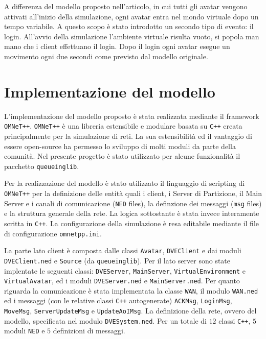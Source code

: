 \documentclass[a4paper, 11pt, oneside]{book}
\theoremstyle{definition}
\theoremstyle{remark}
\begin{document}
A differenza del modello proposto nell'articolo, in cui tutti gli avatar vengono
attivati all'inizio della simulazione, ogni avatar entra nel mondo virtuale
dopo un tempo variabile. A questo scopo è stato introdotto un secondo tipo
di evento: il login. All'avvio della simulazione l'ambiente virtuale
risulta vuoto, si popola man mano che i client effettuano il login.
Dopo il login ogni avatar esegue un movimento ogni due secondi come previsto
dal modello originale.

\chapter{Implementazione del modello}\label{impl}
L'implementazione del modello proposto è stata realizzata mediante il framework
\texttt{OMNeT++}. \texttt{OMNeT++} è una libreria estensibile e modulare
basata su \texttt{C++} creata principalmente per la simulazione di reti.
La sua estensibilità ed il vantaggio di essere open-source ha permesso lo
sviluppo di molti moduli da parte della comunità. Nel presente progetto
è stato utilizzato per alcune funzionalità il pacchetto \texttt{queueinglib}.

Per la realizzazione del modello è stato utilizzato il linguaggio di
scripting di \texttt{OMNeT++} per la definizione delle entità quali i client,
i Server di Partizione, il Main Server e i canali di comunicazione
(\texttt{NED} files), la definzione dei messaggi (\texttt{msg} files) e
la struttura generale della rete. La logica sottostante è stata invece
interamente scritta in \texttt{C++}. La configurazione della simulazione
è resa editabile mediante il file di configurazione \texttt{omnetpp.ini}.

La parte lato client è composta dalle classi \texttt{Avatar}, \texttt{DVEClient}
e dai moduli \texttt{DVEClient.ned} e \texttt{Source} (da \texttt{queueinglib}).
Per il lato server sono state implentate le seguenti classi: \texttt{DVEServer},
\texttt{MainServer}, \texttt{VirtualEnvironment} e \texttt{VirtualAvatar}, ed
i moduli \texttt{DVEServer.ned} e \texttt{MainServer.ned}.
Per quanto riguarda la comunicazione è stata implementata la classe
\texttt{WAN}, il modulo \texttt{WAN.ned} ed i messaggi (con le relative classi
\texttt{C++} autogenerate) \texttt{ACKMsg}, \texttt{LoginMsg}, \texttt{MoveMsg},
\texttt{ServerUpdateMsg} e \texttt{UpdateAoIMsg}. La definizione della rete,
ovvero del modello, specificata nel modulo \texttt{DVESystem.ned}.
Per un totale di $12$ classi \texttt{C++}, $5$ moduli \texttt{NED} e
$5$ definizioni di messaggi.
\end{document}
